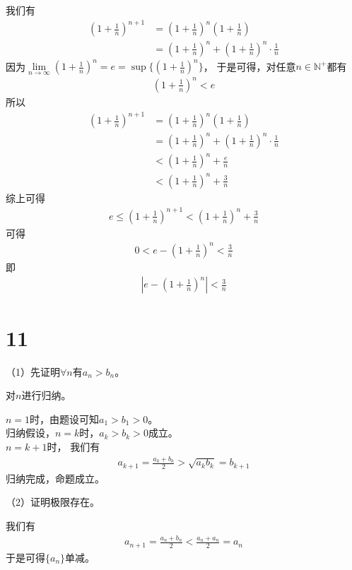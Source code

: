 \documentclass{article}
\begin{document}
我们有
\begin{align*}
  (1 + \frac{1}{n})^{n + 1} & = (1 + \frac{1}{n})^{n} (1 + \frac{1}{n})                        \\
                            & = (1 + \frac{1}{n})^{n} + (1 + \frac{1}{n})^{n}\cdot \frac{1}{n}
\end{align*}
因为$\lim\limits_{n \to \infty} (1 + \frac{1}{n})^{n} = e = \sup\{(1 + \frac{1}{n})^{n}\}$，
于是可得，对任意$n \in \mathbb{N}^+$都有
\begin{align*}
  (1 + \frac{1}{n})^n < e
\end{align*}
所以
\begin{align*}
  (1 + \frac{1}{n})^{n + 1} & = (1 + \frac{1}{n})^{n} (1 + \frac{1}{n})                        \\
                            & = (1 + \frac{1}{n})^{n} + (1 + \frac{1}{n})^{n}\cdot \frac{1}{n} \\
                            & < (1 + \frac{1}{n})^{n} + \frac{e}{n}                            \\
                            & < (1 + \frac{1}{n})^{n} + \frac{3}{n}
\end{align*}
综上可得
\begin{align*}
  e \leq (1 + \frac{1}{n})^{n + 1} <  (1 + \frac{1}{n})^{n} + \frac{3}{n}
\end{align*}
可得
\begin{align*}
  0 < e - (1 + \frac{1}{n})^n < \frac{3}{n}
\end{align*}
即
\begin{align*}
  \left|e - (1 + \frac{1}{n})^n\right| < \frac{3}{n}
\end{align*}

\section*{11}

（1）先证明$\forall n$有$a_n > b_n$。

对$n$进行归纳。

$n = 1$时，由题设可知$a_1 > b_1 > 0$。\\
归纳假设，$n = k$时，$a_k > b_k > 0$成立。\\
$n = k + 1$时，
我们有
\begin{align*}
  a_{k + 1} = \frac{a_k + b_k}{2} > \sqrt{a_k b_k} = b_{k + 1}
\end{align*}
归纳完成，命题成立。

（2）证明极限存在。

我们有
\begin{align*}
  a_{n + 1} = \frac{a_n + b_n}{2} < \frac{a_n + a_n}{2} = a_n
\end{align*}
于是可得$\{a_n\}$单减。
\end{document}
